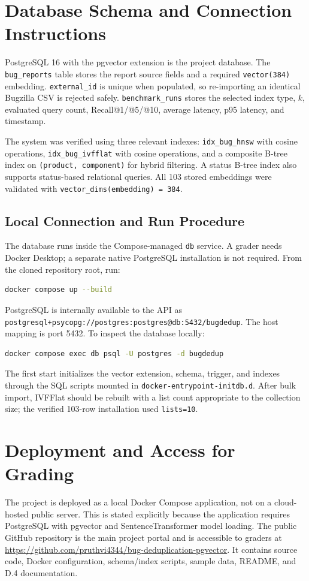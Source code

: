 \documentclass[conference]{IEEEtran}
\newcommand{\repo}{\url{https://github.com/pruthvi4344/bug-deduplication-pgvector}}
\begin{document}
\section{Database Schema and Connection Instructions}
PostgreSQL 16 with the pgvector extension is the project database. The \texttt{bug\_reports} table stores the report source fields and a required \texttt{vector(384)} embedding. \texttt{external\_id} is unique when populated, so re-importing an identical Bugzilla CSV is rejected safely. \texttt{benchmark\_runs} stores the selected index type, $k$, evaluated query count, Recall@1/@5/@10, average latency, p95 latency, and timestamp.

The system was verified using three relevant indexes: \texttt{idx\_bug\_hnsw} with cosine operations, \texttt{idx\_bug\_ivfflat} with cosine operations, and a composite B-tree index on \texttt{(product, component)} for hybrid filtering. A status B-tree index also supports status-based relational queries. All 103 stored embeddings were validated with \texttt{vector\_dims(embedding) = 384}.

\subsection{Local Connection and Run Procedure}
The database runs inside the Compose-managed \texttt{db} service. A grader needs Docker Desktop; a separate native PostgreSQL installation is not required. From the cloned repository root, run:
\begin{lstlisting}[language=bash]
docker compose up --build
\end{lstlisting}
PostgreSQL is internally available to the API as \texttt{postgresql+psycopg://postgres:postgres@db:5432/bugdedup}. The host mapping is port 5432. To inspect the database locally:
\begin{lstlisting}[language=bash]
docker compose exec db psql -U postgres -d bugdedup
\end{lstlisting}
The first start initializes the vector extension, schema, trigger, and indexes through the SQL scripts mounted in \texttt{docker-entrypoint-initdb.d}. After bulk import, IVFFlat should be rebuilt with a list count appropriate to the collection size; the verified 103-row installation used \texttt{lists=10}.

\section{Deployment and Access for Grading}
The project is deployed as a local Docker Compose application, not on a cloud-hosted public server. This is stated explicitly because the application requires PostgreSQL with pgvector and SentenceTransformer model loading. The public GitHub repository is the main project portal and is accessible to graders at \repo. It contains source code, Docker configuration, schema/index scripts, sample data, README, and D.4 documentation.
\end{document}
